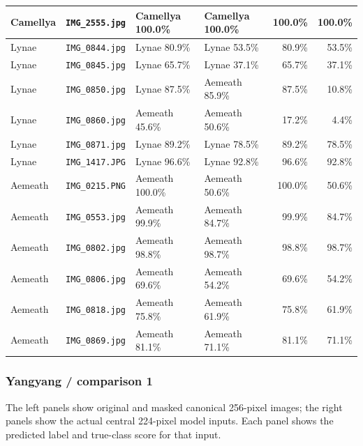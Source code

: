 \documentclass[11pt]{article}
\begin{document}
\begin{center}
\begin{tabular}{llllrr}
Camellya & \texttt{IMG\_2555.jpg} & Camellya 100.0\% & Camellya 100.0\% & 100.0\% & 100.0\% \\

\midrule

Lynae & \texttt{IMG\_0844.jpg} & Lynae 80.9\% & Lynae 53.5\% & 80.9\% & 53.5\% \\

Lynae & \texttt{IMG\_0845.jpg} & Lynae 65.7\% & Lynae 37.1\% & 65.7\% & 37.1\% \\

Lynae & \texttt{IMG\_0850.jpg} & Lynae 87.5\% & Aemeath 85.9\% & 87.5\% & 10.8\% \\

Lynae & \texttt{IMG\_0860.jpg} & Aemeath 45.6\% & Aemeath 50.6\% & 17.2\% & 4.4\% \\

Lynae & \texttt{IMG\_0871.jpg} & Lynae 89.2\% & Lynae 78.5\% & 89.2\% & 78.5\% \\

Lynae & \texttt{IMG\_1417.JPG} & Lynae 96.6\% & Lynae 92.8\% & 96.6\% & 92.8\% \\

\midrule

Aemeath & \texttt{IMG\_0215.PNG} & Aemeath 100.0\% & Aemeath 50.6\% & 100.0\% & 50.6\% \\

Aemeath & \texttt{IMG\_0553.jpg} & Aemeath 99.9\% & Aemeath 84.7\% & 99.9\% & 84.7\% \\

Aemeath & \texttt{IMG\_0802.jpg} & Aemeath 98.8\% & Aemeath 98.7\% & 98.8\% & 98.7\% \\

Aemeath & \texttt{IMG\_0806.jpg} & Aemeath 69.6\% & Aemeath 54.2\% & 69.6\% & 54.2\% \\

Aemeath & \texttt{IMG\_0818.jpg} & Aemeath 75.8\% & Aemeath 61.9\% & 75.8\% & 61.9\% \\

Aemeath & \texttt{IMG\_0869.jpg} & Aemeath 81.1\% & Aemeath 71.1\% & 81.1\% & 71.1\% \\


\bottomrule
\end{tabular}
\end{center}

\clearpage
\subsubsection*{Yangyang / comparison 1}
The left panels show original and masked canonical 256-pixel images; the right panels show the actual central 224-pixel model inputs.
Each panel shows the predicted label and true-class score for that input.
\par\noindent {}\par
\end{document}
